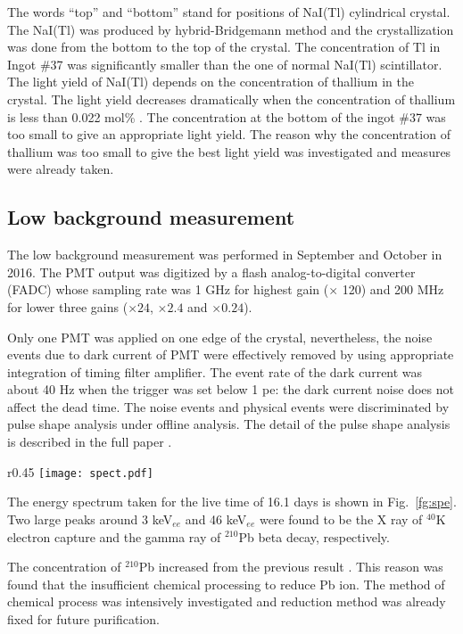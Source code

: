 \documentclass{jpsj-suppl} %
\begin{document}
The words ``top'' and ``bottom'' stand for positions of NaI(Tl) cylindrical crystal.
The NaI(Tl) was produced by hybrid-Bridgemann method and 
the crystallization was done from the bottom to the top of the crystal.
The concentration of Tl in Ingot \#37 was significantly smaller than the one of normal 
NaI(Tl) scintillator.
The light yield of NaI(Tl)  depends on the concentration of thallium in the crystal.
The light yield decreases dramatically when the concentration of thallium is less than 
0.022 mol\% \cite{LightYield}.
The concentration at the bottom of the ingot \#37 was too small to give an appropriate 
light yield.
The reason why the concentration of thallium was too small to give the best light yield 
was investigated and measures were already taken.

\subsection{Low background measurement}
The low background measurement was performed in September and October in 2016.
The PMT output was digitized by a flash analog-to-digital converter (FADC) whose 
sampling rate was 1 GHz for highest gain ($\times$ 120) and
 200 MHz for lower three gains ($\times 24$, $\times 2.4$ and $\times 0.24$).

Only one PMT  was applied on one edge of the crystal, nevertheless, 
the noise events due to dark current of PMT were effectively removed by using appropriate 
integration of timing filter amplifier.
The event rate of the dark current was about 40 Hz when the trigger was set below 1 pe:
the dark current noise does not affect the dead time.
The noise events and physical events were discriminated by pulse shape analysis 
under offline analysis.
The detail of the pulse shape analysis is described in the full paper \cite{Takemoto}.


\begin{wrapfigure}{r}{0.45\textwidth}
\centering
\texttt{[image: spect.pdf]}
\caption{Energy spectrum taken by Ingot \#37. The noise of PMT was removed by pulse 
shape analysis.}
\label{fg:spe}
\end{wrapfigure}
The energy spectrum taken for the live time of 16.1 days is shown in Fig.~\ref{fg:spe}.
Two large peaks around 3 keV$_{ee}$ and 46 keV$_{ee}$  were found to be 
the X ray of $^{40}$K electron capture and the gamma ray of $^{210}$Pb beta decay, respectively.

The concentration of $^{210}$Pb increased from the previous result \cite{ISRD}.
This reason was found that the insufficient chemical processing to reduce Pb ion.
The method of chemical process was intensively investigated and reduction method was 
already fixed for future purification.
\end{document}
